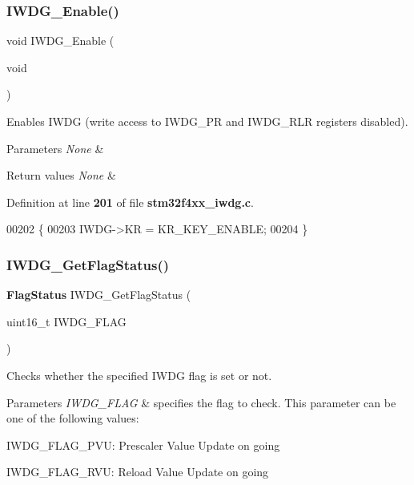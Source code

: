 \subsubsection{I\+W\+D\+G\+\_\+\+Enable()}
{\footnotesize\ttfamily void I\+W\+D\+G\+\_\+\+Enable (\begin{DoxyParamCaption}\item[{void}]{ }\end{DoxyParamCaption})}



Enables I\+W\+DG (write access to I\+W\+D\+G\+\_\+\+PR and I\+W\+D\+G\+\_\+\+R\+LR registers disabled). 


\begin{DoxyParams}{Parameters}
{\em None} & \\
\hline
\end{DoxyParams}

\begin{DoxyRetVals}{Return values}
{\em None} & \\
\hline
\end{DoxyRetVals}


Definition at line \textbf{ 201} of file \textbf{ stm32f4xx\+\_\+iwdg.\+c}.


\begin{DoxyCode}
00202 \{
00203   IWDG->KR = KR_KEY_ENABLE;
00204 \}
\end{DoxyCode}
\mbox{\label{group__IWDG_ga37f050cfbedc0c15f9e0816c0b22011e}} 
\subsubsection{I\+W\+D\+G\+\_\+\+Get\+Flag\+Status()}
{\footnotesize\ttfamily \textbf{ Flag\+Status} I\+W\+D\+G\+\_\+\+Get\+Flag\+Status (\begin{DoxyParamCaption}\item[{uint16\+\_\+t}]{I\+W\+D\+G\+\_\+\+F\+L\+AG }\end{DoxyParamCaption})}



Checks whether the specified I\+W\+DG flag is set or not. 


\begin{DoxyParams}{Parameters}
{\em I\+W\+D\+G\+\_\+\+F\+L\+AG} & specifies the flag to check. This parameter can be one of the following values\+: \begin{DoxyItemize}
\item I\+W\+D\+G\+\_\+\+F\+L\+A\+G\+\_\+\+P\+VU\+: Prescaler Value Update on going \item I\+W\+D\+G\+\_\+\+F\+L\+A\+G\+\_\+\+R\+VU\+: Reload Value Update on going \end{DoxyItemize}
\\
\hline
\end{DoxyParams}

